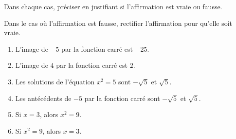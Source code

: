\begin{exo}{}
	Dans chaque cas, préciser en justifiant si l'affirmation est vraie ou fausse.

	Dans le cas où l'affirmation est fausse, rectifier l'affirmation pour qu'elle soit vraie.
	\begin{enumerate}
		\item L'image de $-5$ par la fonction carré est $-25$.
		\item L'image de $4$ par la fonction carré est $2$.
		\item Les solutions de l'équation $x^2 = 5$ sont $-\sqrt{5}$ et $\sqrt{5}$.
		\item Les antécédents de $-5$ par la fonction carré sont $-\sqrt{5}$ et $\sqrt{5}$.
		\item Si $x = 3$, alors $x^2 = 9$.
		\item Si $x^2 = 9$, alors $x = 3$.
	\end{enumerate}
\end{exo}
